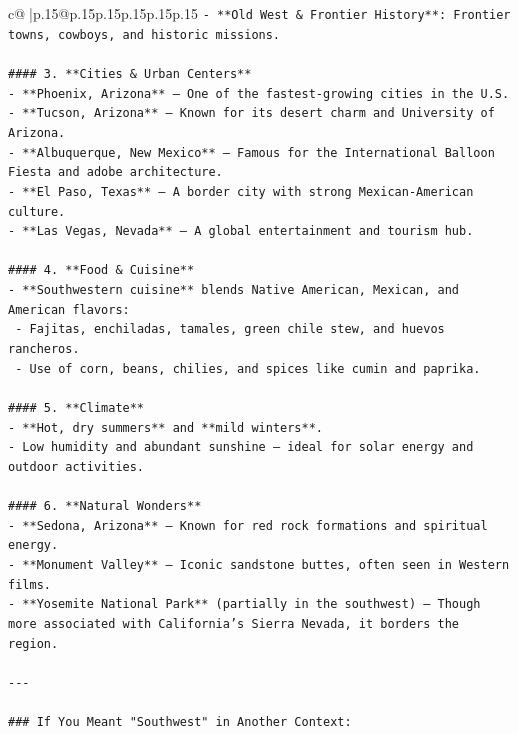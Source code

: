 \documentclass{article}
\begin{document}
{\begin{supertabular}{c@{$\;$}|p{.15\linewidth}@{}p{.15\linewidth}p{.15\linewidth}p{.15\linewidth}p{.15\linewidth}p{.15\linewidth}}
{{{\texttt{{-} **Old West \& Frontier History**: Frontier towns, cowboys, and historic missions.} \\
\\ 
\texttt{\#\#\#\# 3. **Cities \& Urban Centers**} \\
\texttt{{-} **Phoenix, Arizona** – One of the fastest{-}growing cities in the U.S.} \\
\texttt{{-} **Tucson, Arizona** – Known for its desert charm and University of Arizona.} \\
\texttt{{-} **Albuquerque, New Mexico** – Famous for the International Balloon Fiesta and adobe architecture.} \\
\texttt{{-} **El Paso, Texas** – A border city with strong Mexican{-}American culture.} \\
\texttt{{-} **Las Vegas, Nevada** – A global entertainment and tourism hub.} \\
\\ 
\texttt{\#\#\#\# 4. **Food \& Cuisine**} \\
\texttt{{-} **Southwestern cuisine** blends Native American, Mexican, and American flavors:} \\
\texttt{  {-} Fajitas, enchiladas, tamales, green chile stew, and huevos rancheros.} \\
\texttt{  {-} Use of corn, beans, chilies, and spices like cumin and paprika.} \\
\\ 
\texttt{\#\#\#\# 5. **Climate**} \\
\texttt{{-} **Hot, dry summers** and **mild winters**.} \\
\texttt{{-} Low humidity and abundant sunshine — ideal for solar energy and outdoor activities.} \\
\\ 
\texttt{\#\#\#\# 6. **Natural Wonders**} \\
\texttt{{-} **Sedona, Arizona** – Known for red rock formations and spiritual energy.} \\
\texttt{{-} **Monument Valley** – Iconic sandstone buttes, often seen in Western films.} \\
\texttt{{-} **Yosemite National Park** (partially in the southwest) – Though more associated with California’s Sierra Nevada, it borders the region.} \\
\\ 
\texttt{{-}{-}{-}} \\
\\ 
\texttt{\#\#\# If You Meant "Southwest" in Another Context:} \\
}}}
\end{supertabular}}
\end{document}
